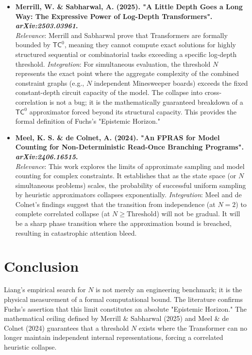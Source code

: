 \documentclass[12pt]{article}
\begin{document}
\begin{itemize}
    \item \textbf{Merrill, W. \& Sabharwal, A. (2025). "A Little Depth Goes a Long Way: The Expressive Power of Log-Depth Transformers". \textit{arXiv:2503.03961}.} \\
    \textit{Relevance}: Merrill and Sabharwal prove that Transformers are formally bounded by $\mathsf{TC}^0$, meaning they cannot compute exact solutions for highly structured sequential or combinatorial tasks exceeding a specific log-depth threshold.
    \textit{Integration}: For simultaneous evaluation, the threshold $N$ represents the exact point where the aggregate complexity of the combined constraint graphs (e.g., $N$ independent Minesweeper boards) exceeds the fixed constant-depth circuit capacity of the model. The collapse into cross-correlation is not a bug; it is the mathematically guaranteed breakdown of a $\mathsf{TC}^0$ approximator forced beyond its structural capacity. This provides the formal definition of Fuchs's "Epistemic Horizon."

    \item \textbf{Meel, K. S. \& de Colnet, A. (2024). "An FPRAS for Model Counting for Non-Deterministic Read-Once Branching Programs". \textit{arXiv:2406.16515}.} \\
    \textit{Relevance}: This work explores the limits of approximate sampling and model counting for complex constraints. It establishes that as the state space (or $N$ simultaneous problems) scales, the probability of successful uniform sampling by heuristic approximators collapses exponentially.
    \textit{Integration}: Meel and de Colnet's findings suggest that the transition from independence (at $N=2$) to complete correlated collapse (at $N \geq \text{Threshold}$) will not be gradual. It will be a sharp phase transition where the approximation bound is breached, resulting in catastrophic attention bleed.
\end{itemize}

\section{Conclusion}
Liang's empirical search for $N$ is not merely an engineering benchmark; it is the physical measurement of a formal computational bound. The literature confirms Fuchs's assertion that this limit constitutes an absolute "Epistemic Horizon." The mathematical ceiling defined by Merrill \& Sabharwal (2025) and Meel \& de Colnet (2024) guarantees that a threshold $N$ exists where the Transformer can no longer maintain independent internal representations, forcing a correlated heuristic collapse.
\end{document}
